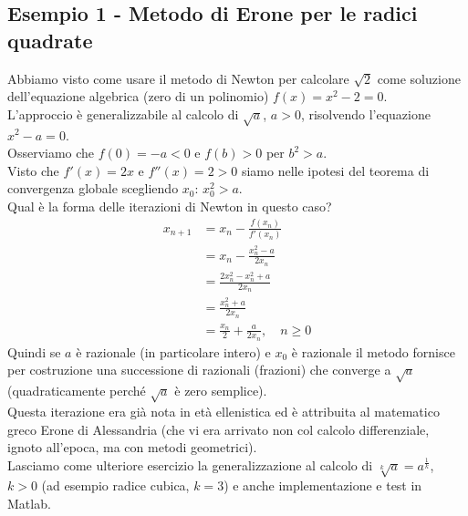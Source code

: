 \documentclass[12pt]{article}
\begin{document}
\subsection{Esempio 1 - Metodo di Erone per le radici quadrate}
Abbiamo visto come usare il metodo di Newton per calcolare $\sqrt{2}$ come soluzione dell'equazione algebrica (zero di un polinomio) $f(x) = x^2 - 2 = 0$.\\
L'approccio è generalizzabile al calcolo di $\sqrt{a}$, $a>0$, risolvendo l'equazione $x^2 - a = 0$.\\
Osserviamo che $f(0) = - a < 0$ e $f(b) > 0$ per $b^2 > a$.\\
Visto che $f'(x) = 2x$ e $f''(x) = 2 > 0$ siamo nelle ipotesi del teorema di convergenza globale scegliendo $x_0$: $x^2_0 > a$.\\
Qual è la forma delle iterazioni di Newton in questo caso?
\[\begin{split}
    x_{n+1} & = x_n - \frac{f(x_n)}{f'(x_n)} \\
    & = x_n - \frac{x_n^2-a}{2 x_n} \\
    & = \frac{2 x_n^2 - x_n^2 + a}{2 x_n} \\
    & = \frac{x_n^2 + a}{2 x_n} \\
    & = \frac{x_n}{2} + \frac{a}{2 x_n}, \quad n \ge 0
\end{split}\]
Quindi se $a$ è razionale (in particolare intero) e $x_0$ è razionale il metodo fornisce per costruzione una successione di razionali (frazioni) che converge a $\sqrt{a}$ (quadraticamente perché $\sqrt{a}$ è zero semplice).\\
Questa iterazione era già nota in età ellenistica ed è attribuita al matematico greco Erone di Alessandria (che vi era arrivato non col calcolo differenziale, ignoto all'epoca, ma con metodi geometrici).\\
Lasciamo come ulteriore esercizio la generalizzazione al calcolo di $\sqrt[k]{a} = a^{\frac{1}{k}}$, $k>0$ (ad esempio radice cubica, $k=3$) e anche implementazione e test in Matlab.
\end{document}
